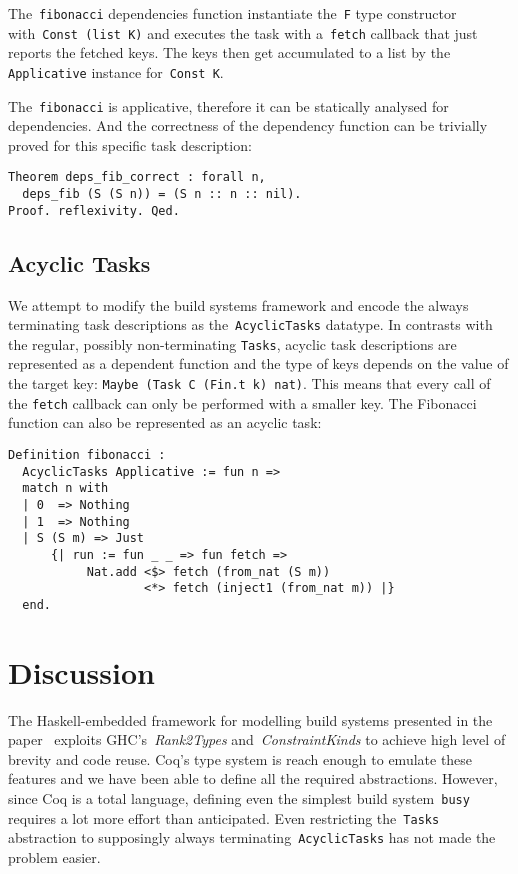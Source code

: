 \documentclass[sigplan,review]{acmart}\settopmatter{printfolios=true,printccs=false,printacmref=false}
\newcommand{\hs}{\texttt}
\newcommand{\coq}{\texttt}
\begin{document}
The~\coq{fibonacci} dependencies function instantiate the~\hs{F} type constructor
with~\hs{Const (list K)} and executes the task with a~\hs{fetch} callback that
just reports the fetched keys. The keys then get accumulated to a list by the
\hs{Applicative} instance for~\hs{Const K}.

The~\coq{fibonacci} is applicative, therefore it can be statically analysed for
dependencies. And the correctness of the dependency function can be trivially proved
for this specific task description:

\begin{verbatim}
Theorem deps_fib_correct : forall n,
  deps_fib (S (S n)) = (S n :: n :: nil).
Proof. reflexivity. Qed.
\end{verbatim}

\vspace{-3mm}
\subsection{Acyclic Tasks}

We attempt to modify the build systems framework and encode the always terminating
task descriptions as the~\hs{AcyclicTasks} datatype. In contrasts with the regular,
possibly non-terminating \hs{Tasks}, acyclic task descriptions are represented as
a dependent function and the type of keys depends on the value of the target key:
\hs{Maybe (Task C (Fin.t k) nat)}. This means that every call of the \hs{fetch}
callback can only be performed with a smaller key. The Fibonacci function
can also be represented as an acyclic task:

\vspace{-1mm}
\begin{verbatim}
Definition fibonacci :
  AcyclicTasks Applicative := fun n =>
  match n with
  | 0  => Nothing
  | 1  => Nothing
  | S (S m) => Just
      {| run := fun _ _ => fun fetch =>
           Nat.add <$> fetch (from_nat (S m))
                   <*> fetch (inject1 (from_nat m)) |}
  end.
\end{verbatim}

\vspace{-3mm}
\section{Discussion}\label{sec-discussion}
\vspace{-1mm}

The Haskell-embedded framework for modelling build systems presented in the
paper~\cite{Mokhov2018icfp} exploits GHC's~\emph{Rank2Types}
and~\emph{ConstraintKinds} to achieve high level of brevity and code reuse.
Coq's type system is reach enough to emulate these features and we have been able
to define all the required abstractions. However, since Coq is a total language,
defining even the simplest build system~\hs{busy} requires a lot more
effort than anticipated. Even restricting the~\hs{Tasks} abstraction to
supposingly always terminating~\hs{AcyclicTasks} has not made the problem easier.
\end{document}
